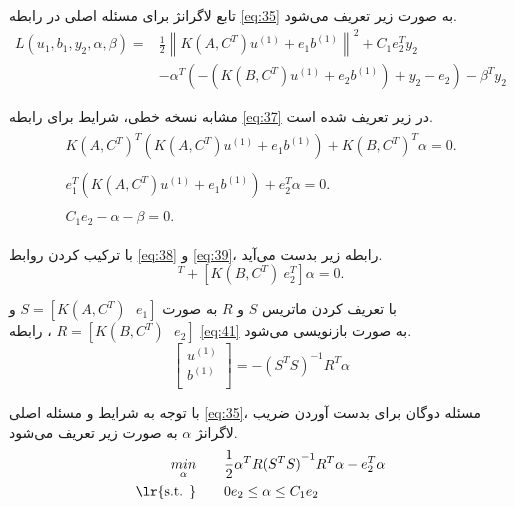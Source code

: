 تابع لاگرانژ برای مسئله اصلی در رابطه \ref{eq:35} به صورت زیر تعریف می‌شود.
\begin{equation}
\begin{split}
L(u_{1},b_{1},y_{2}, \alpha, \beta )= & \frac{1}{2}{{\left\| K(A, C^{T}){{u}^{(1)}}+{{e}_{1}}{{b}^{(1)}} \right\|}^{2}} + {{C}_{1}}e_{2}^{T}y_{2} \\
&-\alpha^{T}(-(K(B, C^{T})u^{(1)}+e_{2}b^{(1)})+y_{2} - e_{2}) - \beta^{T}y_{2}
\end{split}
\label{eq:37}
\end{equation}

مشابه نسخه خطی، شرایط  برای رابطه \ref{eq:37} در زیر تعریف شده است.
\begin{align}
\label{eq:38}
\begin{split}
K(A, C^{T})^{T}(K(A,C^{T}){{u}^{(1)}}+{{e}_{1}}{{b}^{(1)}}) + K(B, C^{T})^{T}\alpha = 0.
\end{split} \\
\label{eq:39}
\begin{split}
e_{1}^{T}(K(A,C^{T}){{u}^{(1)}}+{{e}_{1}}{{b}^{(1)}}) + e_{2}^{T}\alpha = 0.
\end{split}\\
\label{eq:40}
\begin{split}
C_{1}e_{2} - \alpha - \beta = 0.
\end{split} 
\end{align}

با ترکیب کردن روابط \ref{eq:38} و \ref{eq:39}، رابطه زیر بدست می‌آید.
\begin{equation}
[K(A,C^{T})^{T}\ e^{T}_{1}][K(A,C^{T})\ e_{1}][u^{(1)}\ b^{(1)}]^{T} + [K(B, C^{T})\ e^{T}_{2}]\alpha = 0.
\label{eq:41}
\end{equation}

با تعریف کردن ماتریس $S$ و $R$  به صورت $S=[K(A,C^{T})\text{ }e_{1}]$ و $R=[K(B,C^{T})\text{ }e_{2}]$ ، رابطه \ref{eq:41} به صورت بازنویسی می‌شود.
\begin{equation}
\left[ \begin{matrix}
{{u}^{(1)}} \\
{{b}^{(1)}} \\
\end{matrix}\right]= -{{({{S}^{T}}S)}^{-1}}{{R}^{T}}\alpha
\label{eq:42}
\end{equation}

با توجه به شرایط  و مسئله اصلی \ref{eq:35}، مسئله دوگان برای بدست آوردن ضریب لاگرانژ $\alpha$ به صورت زیر تعریف می‌شود.
\begin{equation}
\begin{split}
\mathop{{ min}}\limits_{\alpha} \qquad & \frac{1}{2}{{\alpha }^{T}}R{{({{S}^{T}}S)}^{-1}}{{R}^{T}}\alpha -e_{2}^{T}\alpha  \\
\textrm{\lr{s.t. }} \qquad & 0{{e}_{2}}\le \alpha \le {{C}_{1}}{{e}_{2}}
\end{split}
\label{eq:43}
\end{equation}

